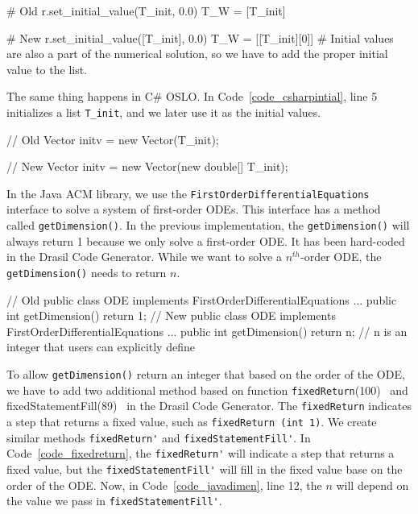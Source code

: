 \begin{listing}
\begin{python1}
# Old 
  r.set_initial_value(T_init, 0.0)
  T_W = [T_init]

# New 
  r.set_initial_value([T_init], 0.0)
  T_W = [[T_init][0]] # Initial values are also a part of the numerical solution, so we have to add the proper initial value to the list.
\end{python1}
\label{code_pythonintial}
\end{listing}
The same thing happens in C\# OSLO. In Code~\ref{code_csharpintial}, line 5 initializes a list \verb|T_init|, and we later use it as the initial values.  
\begin{listing}[ht]
\begin{csharp1}
// Old 
Vector initv = new Vector(T_init);

// New 
Vector initv = new Vector(new double[] {T_init});
\end{csharp1}
\label{code_csharpintial}
\end{listing}

In the Java ACM library, we use the \verb|FirstOrderDifferentialEquations| interface to solve a system of first-order ODEs. This interface has a method called \verb|getDimension()|. In the previous implementation, the \verb|getDimension()| will always return 1 because we only solve a first-order ODE. It has been hard-coded in the Drasil Code Generator. While we want to solve a $n^{th}$-order ODE, the \verb|getDimension()| needs to return $n$.

\begin{listing}
\begin{java1}
// Old 
public class ODE implements FirstOrderDifferentialEquations {
  ...
  public int getDimension() {
    return 1;
  }
}
// New 
public class ODE implements FirstOrderDifferentialEquations {
  ...
  public int getDimension() {
    return n; // n is an integer that users can explicitly define
  }
}
\end{java1}
\label{code_javadimen}
\end{listing}

To allow \verb|getDimension()| return an integer that based on the order of the ODE, we have to add two additional method based on function \verb|fixedReturn|(100)~\citep{brooks} and fixedStatementFill(89)~\citep{brooks} in the Drasil Code Generator. The \verb|fixedReturn| indicates a step that returns a fixed value, such as \verb|fixedReturn (int 1)|. We create similar methods \verb|fixedReturn'| and \verb|fixedStatementFill'|. In Code~\ref{code_fixedreturn}, the \verb|fixedReturn'| will indicate a step that returns a fixed value, but the \verb|fixedStatementFill'| will fill in the fixed value base on the order of the ODE. Now, in Code~\ref{code_javadimen}, line 12, the $n$ will depend on the value we pass in \verb|fixedStatementFill'|.

